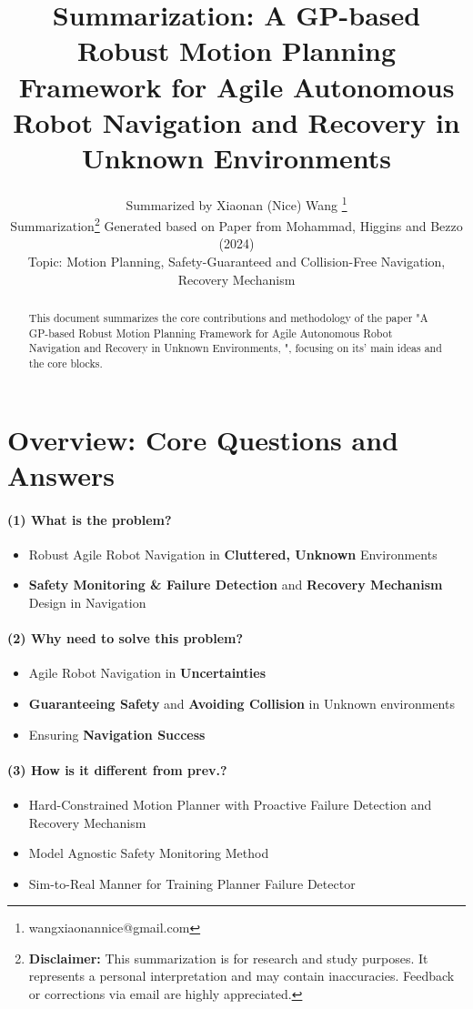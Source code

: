 \documentclass{article}
\title{Summarization: A GP-based Robust Motion Planning Framework for Agile Autonomous Robot Navigation and Recovery in Unknown Environments}
\author{
  Summarized by Xiaonan (Nice) Wang \thanks{wangxiaonannice@gmail.com} \\
  Summarization\thanks{\textbf{Disclaimer:} This summarization is for research and study purposes. It represents a personal interpretation and may contain inaccuracies. Feedback or corrections via email are highly appreciated.} Generated based on Paper from Mohammad, Higgins and Bezzo (2024) \\
  Topic: Motion Planning, Safety-Guaranteed and Collision-Free Navigation, Recovery Mechanism \\
}
\begin{document}
\maketitle

\begin{abstract}
This document summarizes the core contributions and methodology of the paper "A GP-based Robust Motion Planning Framework for Agile Autonomous Robot Navigation and Recovery in Unknown Environments, \cite{mohammad2024gp}", focusing on its' main ideas and the core blocks.
\end{abstract}

\section{Overview: Core Questions and Answers}

\paragraph{(1) What is the problem?} 
\begin{itemize}
  \item Robust Agile Robot Navigation in \textbf{Cluttered, Unknown} Environments
  \item \textbf{Safety Monitoring \& Failure Detection} and \textbf{Recovery Mechanism} Design in Navigation
\end{itemize}

\paragraph{(2) Why need to solve this problem?}
\begin{itemize}
  \item Agile Robot Navigation in \textbf{Uncertainties}
  \item \textbf{Guaranteeing Safety} and \textbf{Avoiding Collision} in Unknown environments
  \item Ensuring \textbf{Navigation Success}
\end{itemize}

\paragraph{(3) How is it different from prev.?}
\begin{itemize}
  \item Hard-Constrained Motion Planner with Proactive Failure Detection and Recovery Mechanism
  \item Model Agnostic Safety Monitoring Method
  \item Sim-to-Real Manner for Training Planner Failure Detector
\end{itemize}
\end{document}
